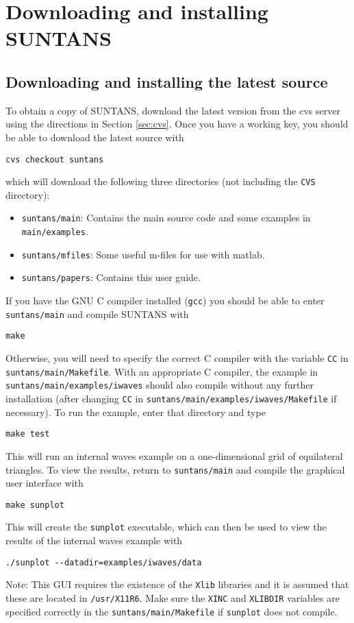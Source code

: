 \section{Downloading and installing SUNTANS}

\subsection{Downloading and installing the latest source} \label{sec:download}

To obtain a copy of SUNTANS, download the latest version from the cvs server
using the directions in Section \ref{sec:cvs}.  Once you have a working key, you should
be able to download the latest source with
\begin{verbatim}
cvs checkout suntans
\end{verbatim}
which will download the following three directories (not including the \verb+CVS+ directory):
\begin{itemize}
\item \verb+suntans/main+: Contains the main source code and some examples in \verb+main/examples+.
\item \verb+suntans/mfiles+: Some useful m-files for use with matlab.
\item \verb+suntans/papers+: Contains this user guide.
\end{itemize}

If you have the GNU C compiler installed (\verb+gcc+) you should be able to enter \verb+suntans/main+ and
compile SUNTANS with
\begin{verbatim}
make
\end{verbatim}
Otherwise, you will need to specify the correct C compiler with the variable \verb+CC+ in\\
\verb+suntans/main/Makefile+.  With an appropriate C compiler, the example in \\
\verb+suntans/main/examples/iwaves+ should also compile without any further
installation (after changing \verb+CC+ in \verb+suntans/main/examples/iwaves/Makefile+ if necessary).  
To run the example, enter that directory and type
\begin{verbatim}
make test
\end{verbatim}
This will run an internal waves example on a one-dimensional grid of equilateral
triangles.  To view the results, return to \verb+suntans/main+ and compile the graphical
user interface with
\begin{verbatim}
make sunplot
\end{verbatim}
This will create the \verb+sunplot+ executable, which can then be used to view the
results of the internal waves example with
\begin{verbatim}
./sunplot --datadir=examples/iwaves/data
\end{verbatim}
Note:  This GUI requires the
existence of the \verb+Xlib+ libraries and it is assumed that these are located
in \verb+/usr/X11R6+.  Make sure the \verb+XINC+ and \verb+XLIBDIR+ variables
are specified correctly in the \verb+suntans/main/Makefile+ if \verb+sunplot+ does not compile.

